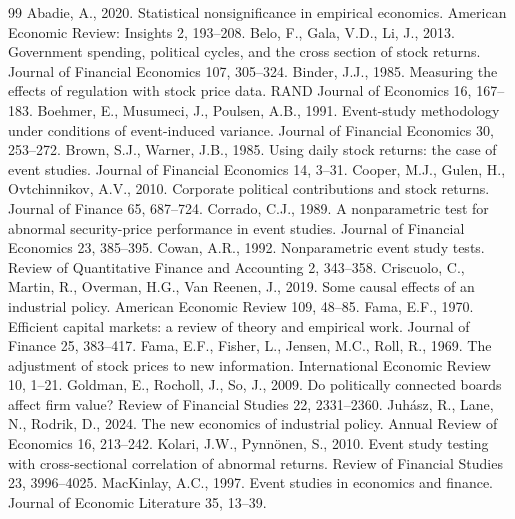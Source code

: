 \documentclass[12pt]{article}
\begin{document}
\begin{thebibliography}{99}
 Abadie, A., 2020. Statistical nonsignificance in empirical
economics. American Economic Review: Insights 2, 193--208.
 Belo, F., Gala, V.D., Li, J., 2013.
Government spending, political cycles, and the cross section of stock returns.
Journal of Financial Economics 107, 305--324.
 Binder, J.J., 1985.
Measuring the effects of regulation with stock price data. RAND Journal of Economics 16, 167--183.
 Boehmer, E., Musumeci, J., Poulsen, A.B., 1991.
Event-study methodology under conditions of event-induced variance. Journal of Financial
Economics 30, 253--272.
 Brown, S.J., Warner, J.B., 1985.
Using daily stock returns: the case of event studies. Journal of Financial Economics 14, 3--31.
 Cooper, M.J., Gulen, H., Ovtchinnikov, A.V., 2010.
Corporate political contributions and stock returns. Journal of Finance 65, 687--724.
 Corrado, C.J., 1989.
A nonparametric test for abnormal security-price performance in event studies.
Journal of Financial Economics 23, 385--395.
 Cowan, A.R., 1992.
Nonparametric event study tests. Review of Quantitative Finance and Accounting 2, 343--358.
 Criscuolo, C., Martin, R., Overman, H.G., Van Reenen, J., 2019.
Some causal effects of an industrial policy. American Economic Review 109, 48--85.
 Fama, E.F., 1970.
Efficient capital markets: a review of theory and empirical work. Journal of Finance 25, 383--417.
 Fama, E.F., Fisher, L., Jensen, M.C., Roll, R., 1969.
The adjustment of stock prices to new information. International Economic Review 10, 1--21.
 Goldman, E., Rocholl, J., So, J., 2009.
Do politically connected boards affect firm value? Review of Financial Studies 22, 2331--2360.
 Juh\'asz, R., Lane, N., Rodrik, D., 2024.
The new economics of industrial policy. Annual Review of Economics 16, 213--242.
 Kolari, J.W., Pynn\"onen, S., 2010.
Event study testing with cross-sectional correlation of abnormal returns.
Review of Financial Studies 23, 3996--4025.
 MacKinlay, A.C., 1997.
Event studies in economics and finance. Journal of Economic Literature 35, 13--39.

\end{thebibliography}
\end{document}
